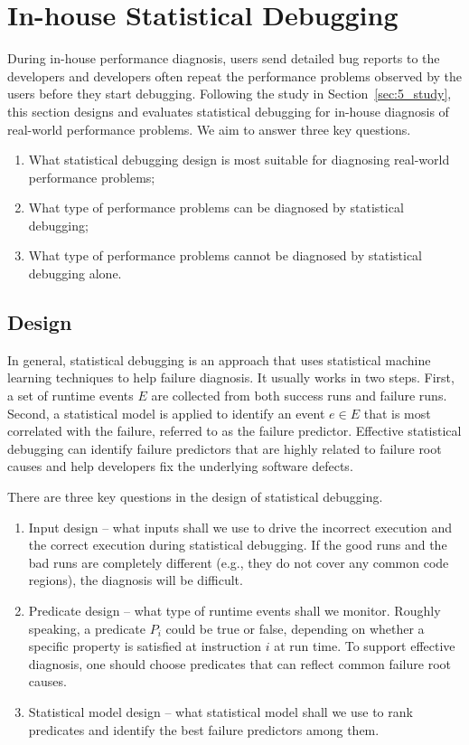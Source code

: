 \section{In-house Statistical Debugging}
\label{sec:5_inhouse}
During in-house performance diagnosis, users send detailed bug reports to
the developers and developers often repeat the performance problems
observed by the users before they start debugging.
Following the study in Section~\ref{sec:5_study}, this section designs and
evaluates statistical debugging for in-house diagnosis of real-world
performance problems.
We aim to answer three key questions.

\begin{enumerate}
\item What statistical debugging design is most suitable for diagnosing
real-world performance problems;
\item What type of performance problems can be diagnosed by statistical
debugging;
\item What type of performance problems cannot be diagnosed by statistical
debugging alone.
\end{enumerate}

\subsection{Design}
In general, statistical debugging 
\citep{liblit03,liblit05,CCI,tarantula1,tarantula2,tarantula.darko,joy.asplos13}
is an approach that uses statistical machine learning techniques to help
failure diagnosis. It usually works in two steps.
First, a set of runtime 
events $E$ are collected from both success runs and failure runs.
Second, a statistical model is applied to identify an event $e \in E $
that is most correlated with the failure, referred to as the failure predictor. 
Effective statistical debugging can identify failure predictors that are
highly related to failure root causes and help developers fix the underlying
software defects.

There are three key questions in the design of statistical debugging.
\begin{enumerate}
\item Input design --
what inputs shall we use to drive the 
incorrect execution and the correct execution during statistical debugging.
If the good runs and the bad runs are completely different
(e.g., they do not cover any common code regions), the diagnosis will
be difficult.
\item Predicate design -- what type of runtime events shall we monitor.
Roughly speaking, a predicate $P_i$ could be true or false, depending on 
whether a specific property is satisfied at instruction $i$ at run time.
To support effective diagnosis, one should choose predicates that can reflect 
common failure root causes.
\item Statistical model design -- what statistical model shall we use to
rank predicates and identify the best failure predictors among them.
\end{enumerate}

